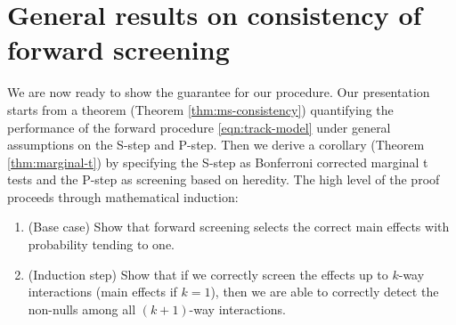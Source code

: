 \documentclass[12pt]{article}
\begin{document}



\appendix



\section{General results on consistency of forward screening}

We are now ready to show the guarantee for our procedure. Our presentation starts from a theorem (Theorem \ref{thm:ms-consistency}) quantifying the performance of the forward procedure \eqref{eqn:track-model} under general assumptions on the S-step and P-step. Then we derive a corollary (Theorem \ref{thm:marginal-t}) by specifying the S-step as Bonferroni corrected marginal t tests and the P-step as screening based on heredity.  The high level of the proof proceeds through mathematical induction:
\begin{enumerate}
    \item (Base case) Show that forward screening selects the correct main effects with probability tending to one.
    
    \item (Induction step) Show that if we correctly screen the effects up to $k$-way interactions (main effects if $k=1$), then we are able to correctly detect the non-nulls among all $(k+1)$-way interactions. 
\end{enumerate}
\end{document}
